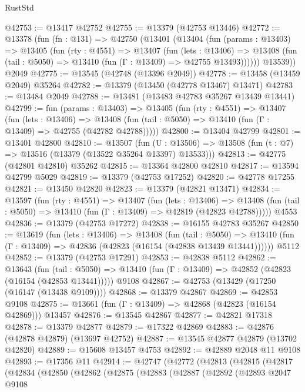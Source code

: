 \begin{lexlean}{RustStd}
\begin{coremodule}
@42753 := @13417 @42752
@42755 := @13379 (@42753 @13446)
@42772 := @13378
    (fun (fn : @131) =>
    @42750
      (@13401
        (@13404
          (fun (params : @13403) =>
          @13405
            (fun (rty : @4551) =>
            @13407
              (fun (lets : @13406) =>
              @13408 (fun (tail : @5050) => @13410 (fun (Γ : @13409) => @42755 @13493))))))
        @13539))
    @2049
@42775 := @13545 (@42748 (@13396 @2049))
@42778 := @13458 (@13459 @2049) @35264
@42782 := @13379 (@13450 (@42778 @13467) @13471)
@42783 := @13484 @2049
@42788 := @13481 (@13483 @42783 @35267 @13439 @13441)
@42799 := fun (params : @13403) =>
  @13405
    (fun (rty : @4551) =>
    @13407
      (fun (lets : @13406) =>
      @13408 (fun (tail : @5050) => @13410 (fun (Γ : @13409) => @42755 (@42782 @42788)))))
@42800 := @13404 @42799
@42801 := @13401 @42800
@42810 := @13507
    (fun (U : @13506) => @13508 (fun (t : @7) => @13516 (@13379 (@13522 @35264 @13397) @13533)))
@42813 := @42775 (@42801 @42810) @35262
@42815 := @13364 @42800 @42810
@42817 := @13594 @42799 @5029
@42819 := @13379 (@42753 @17252)
@42820 := @42778 @17255
@42821 := @13450 @42820
@42823 := @13379 (@42821 @13471)
@42834 := @13597
    (fun (rty : @4551) =>
    @13407
      (fun (lets : @13406) =>
      @13408 (fun (tail : @5050) => @13410 (fun (Γ : @13409) => @42819 (@42823 @42788)))))
    @4553
@42836 := @13379 (@42753 @17272)
@42838 := @16155 @42783 @35267
@42850 := @13619
    (fun (lets : @13406) =>
    @13408
      (fun (tail : @5050) =>
      @13410 (fun (Γ : @13409) => @42836 (@42823 (@16154 (@42838 @13439 @13441))))))
    @5112
@42852 := @13379 (@42753 @17291)
@42853 := @42838 @5112
@42862 := @13643
    (fun (tail : @5050) => @13410 (fun (Γ : @13409) => @42852 (@42823 (@16154 (@42853 @13441)))))
    @9108
@42867 := @42753 (@13429 (@17250 (@16147 (@13438 @9109))))
@42868 := @13379 @42867
@42869 := @42853 @9108
@42875 := @13661 (fun (Γ : @13409) => @42868 (@42823 (@16154 @42869))) @13457
@42876 := @13545 @42867
@42877 := @42821 @17318
@42878 := @13379 @42877
@42879 := @17322 @42869
@42883 := @42876 (@42878 @42879) (@13697 @42752)
@42887 := @13545 @42877 @42879 (@13702 @42820)
@42889 := @15608 @13457 @4753
@42892 := @42889 @2048 @11 @9108
@42893 := @17356 @11
@42914 := @42747
    (@42772
      (@42813
        (@42815
          (@42817
            (@42834
              (@42850
                (@42862
                  (@42875
                    (@42883
                      (@42887
                        (@42892
                          (@42893
                            @2047
                            @9108

\end{coremodule}
\end{lexlean}
